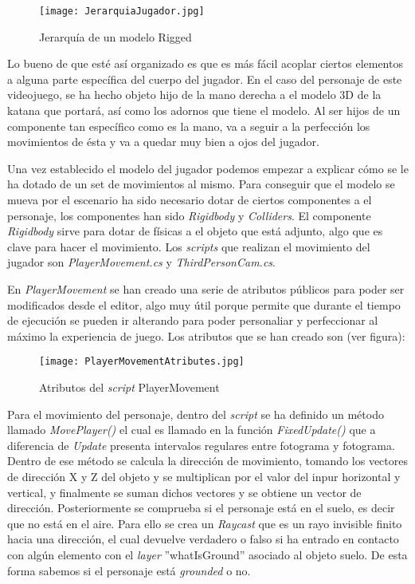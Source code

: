 \begin{figure}[H]
    \centering
    \texttt{[image: JerarquiaJugador.jpg]}
    \caption{Jerarquía de un modelo Rigged}
\end{figure}

Lo bueno de que esté así organizado es que es más fácil acoplar ciertos elementos a alguna parte específica del cuerpo del jugador. En el caso del personaje de este videojuego, se ha hecho objeto hijo de la mano derecha a el modelo 3D de la katana que portará, así como los adornos que tiene el modelo. Al ser hijos de un componente tan específico como es la mano, va a seguir a la perfección los movimientos de ésta y va a quedar muy bien a ojos del jugador.

Una vez establecido el modelo del jugador podemos empezar a explicar cómo se le ha dotado de un set de movimientos al mismo. Para conseguir que el modelo se mueva por el escenario ha sido necesario dotar de ciertos componentes a el personaje, los componentes han sido \textit{Rigidbody} y \textit{Colliders}. El componente \textit{Rigidbody} sirve para dotar de físicas a el objeto que está adjunto, algo que es clave para hacer el movimiento. Los \textit{scripts} que realizan el movimiento del jugador son \textit{PlayerMovement.cs} y \textit{ThirdPersonCam.cs}. 

En \textit{PlayerMovement} se han creado una serie de atributos públicos para poder ser modificados desde el editor, algo muy útil porque permite que durante el tiempo de ejecución se pueden ir alterando para poder personaliar y perfeccionar al máximo la experiencia de juego. Los atributos que se han creado son (ver figura):

\begin{figure}[H]
    \centering
    \texttt{[image: PlayerMovementAtributes.jpg]}
    \caption{Atributos del \textit{script} PlayerMovement}
\end{figure}

Para el movimiento del personaje, dentro del \textit{script} se ha definido un método llamado \textit{MovePlayer()} el cual es llamado en la función \textit{FixedUpdate()} que a diferencia de \textit{Update} presenta intervalos regulares entre fotograma y fotograma. Dentro de ese método se calcula la dirección de movimiento, tomando los vectores de dirección X y Z del objeto y se multiplican por el valor del inpur horizontal y vertical, y finalmente se suman dichos vectores y se obtiene un vector de dirección. Posteriormente se comprueba si el personaje está en el suelo, es decir que no está en el aire. Para ello se crea un \textit{Raycast} que es un rayo invisible finito hacia una dirección, el cual devuelve verdadero o falso si ha entrado en contacto con algún elemento con el \textit{layer} ''whatIsGround'' asociado al objeto suelo. De esta forma sabemos si el personaje está \textit{grounded} o no.

